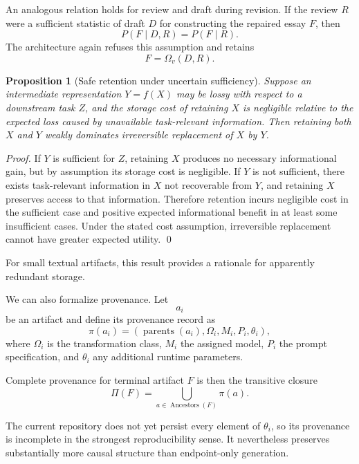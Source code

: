 \documentclass[11pt]{article}
\newtheorem{proposition}[definition]{Proposition}
\begin{document}
An analogous relation holds for review and draft during revision. If the review \(R\) were a sufficient statistic of draft \(D\) for constructing the repaired essay \(F\), then
\[
    P(F\mid D,R)=P(F\mid R).
\]
The architecture again refuses this assumption and retains
\[
    F=\Omega_v(D,R).
\]

\begin{proposition}[Safe retention under uncertain sufficiency]
Suppose an intermediate representation \(Y=f(X)\) may be lossy with respect to a downstream task \(Z\), and the storage cost of retaining \(X\) is negligible relative to the expected loss caused by unavailable task-relevant information. Then retaining both \(X\) and \(Y\) weakly dominates irreversible replacement of \(X\) by \(Y\).
\end{proposition}

\begin{proof}
If \(Y\) is sufficient for \(Z\), retaining \(X\) produces no necessary informational gain, but by assumption its storage cost is negligible. If \(Y\) is not sufficient, there exists task-relevant information in \(X\) not recoverable from \(Y\), and retaining \(X\) preserves access to that information. Therefore retention incurs negligible cost in the sufficient case and positive expected informational benefit in at least some insufficient cases. Under the stated cost assumption, irreversible replacement cannot have greater expected utility. \qed
\end{proof}

For small textual artifacts, this result provides a rationale for apparently redundant storage.

We can also formalize provenance. Let
\[
    a_i
\]
be an artifact and define its provenance record as
\[
    \pi(a_i)
    =
    \left(
        \operatorname{parents}(a_i),
        \Omega_i,
        M_i,
        P_i,
        \theta_i
    \right),
\]
where \(\Omega_i\) is the transformation class, \(M_i\) the assigned model, \(P_i\) the prompt specification, and \(\theta_i\) any additional runtime parameters.

Complete provenance for terminal artifact \(F\) is then the transitive closure
\[
    \Pi(F)
    =
    \bigcup_{a\in\operatorname{Ancestors}(F)}
    \pi(a).
\]

The current repository does not yet persist every element of \(\theta_i\), so its provenance is incomplete in the strongest reproducibility sense. It nevertheless preserves substantially more causal structure than endpoint-only generation.
\end{document}
